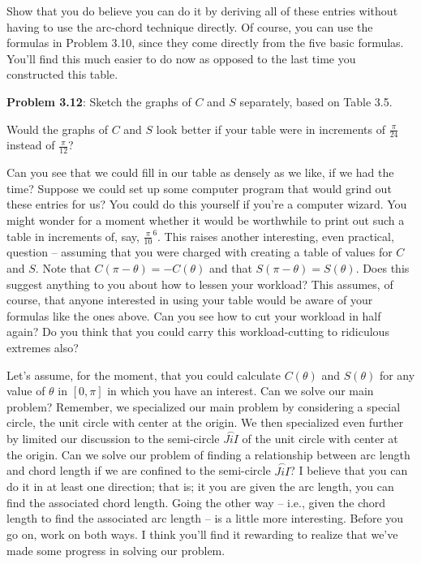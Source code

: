 \documentclass[english]{book}
\newcommand{\arc}[1]{\overset{\frown}{#1} }
\begin{document}
Show that you do believe you can do it by deriving all of these entries without having to use the arc-chord technique directly. Of course, you can use the formulas in Problem 3.10, since they come directly from the five basic formulas. You'll find this much easier to do now as opposed to the last time you constructed this table.

\vspace{0.3cm}

\textbf{Problem 3.12}: Sketch the graphs of $C$ and $S$ separately, based on Table 3.5.

Would the graphs of $C$ and $S$ look better if your table were in increments of $\frac{\pi}{24}$ instead of $\frac{\pi}{12}$?

Can you see that we could fill in our table as densely as we like, if we had the time? Suppose we could set up some computer program that would grind out these entries for us? You could do this yourself if you're a computer wizard. You might wonder for a moment whether it would be worthwhile to print out such a table in increments of, say, $\frac{\pi}{10}^{6}$. This raises another interesting, even practical, question -- assuming that you were charged with creating a table of values for $C$ and $S$. Note that $C(\pi-\theta) = -C(\theta)$ and that $S(\pi-\theta) = S(\theta)$. Does this suggest anything to you about how to lessen your workload? This assumes, of course, that anyone interested in using your table would be aware of your formulas like the ones above. Can you see how to cut your workload in half again? Do you think that you could carry this workload-cutting to ridiculous extremes also?

Let's assume, for the moment, that you could calculate $C(\theta)$ and $S(\theta)$ for any value of $\theta$ in $[0,\pi]$ in which you have an interest. Can we solve our main problem? Remember, we specialized our main problem by considering a special circle, the unit circle with center at the origin. We then specialized even further by limited our discussion to the semi-circle $\arc{JiI}$ of the unit circle with center at the origin. Can we solve our problem of finding a relationship between arc length and chord length if we are confined to the semi-circle $\arc{JiI}$? I believe that you can do it in at least one direction; that is; it you are given the arc length, you can find the associated chord length. Going the other way -- i.e., given the chord length to find the associated arc length -- is a little more interesting. Before you go on, work on both ways. I think you'll find it rewarding to realize that we've made some progress in solving our problem.
\end{document}
